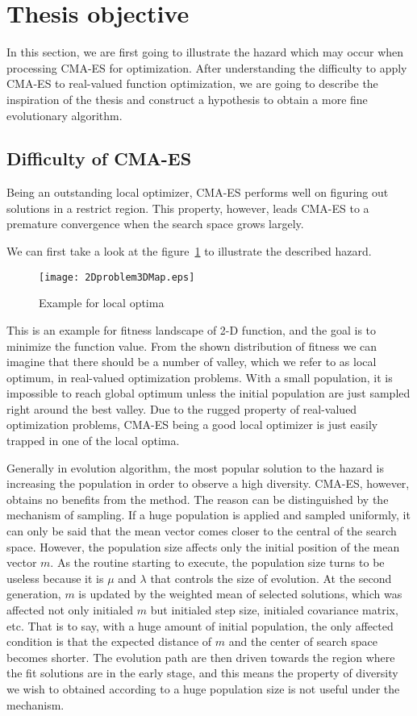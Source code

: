 \section{Thesis objective} \label{sec:motivation}

In this section, we are first going to illustrate the
hazard which may occur when processing CMA-ES for
optimization.
After understanding the difficulty to apply CMA-ES to real-valued
function optimization, we are going to describe the inspiration of the
thesis and construct a hypothesis to obtain a more fine evolutionary
algorithm.
\subsection{Difficulty of CMA-ES} Being an outstanding local optimizer,
CMA-ES performs well on figuring out solutions in a restrict region.
This property, however, leads CMA-ES to a premature convergence when the
search space grows largely. 

We can first take a look at the figure~\ref{fig:localExample} to
illustrate the described hazard.
\begin{figure}[h] \begin{center}
    \texttt{[image: 2Dproblem3DMap.eps]}
    \caption{Example for local optima}
    \label{fig:localExample} 
  \end{center} 
\end{figure}
This is an example for fitness landscape of 2-D
function, and the goal is to minimize the function
value.  From the shown distribution of fitness we can
imagine that there should be a number of valley, which
we refer to as local optimum, in real-valued
optimization problems.  With a small population, it is
impossible to reach global optimum unless the initial
population are just sampled right around the best
valley.  Due to the rugged property of real-valued
optimization problems, CMA-ES being a good local
optimizer is just easily trapped in one of the local
optima.

  Generally in evolution algorithm, the most popular
  solution to the hazard is increasing the population
  in order to observe a high diversity.  CMA-ES,
  however, obtains no benefits from the method.  The
  reason can be distinguished by the mechanism of
sampling.  If a huge population is applied and
sampled uniformly, it can only be said that the mean
vector comes closer to the central of the search
space.  However, the population size affects only
the initial position of the mean vector $m$.  As the
routine starting to execute, the population size
turns to be useless because it is $\mu$ and
$\lambda$ that controls the size of evolution.  At
the second generation, $m$ is updated by the
weighted mean of selected solutions, which was
affected not only initialed $m$ but initialed step
size, initialed covariance matrix, etc.  That is to
say, with a huge amount of initial population, the
only affected condition is that the expected
distance of $m$ and the center of search space
becomes shorter.  The evolution path are then driven
towards the region where the fit solutions are in
the early stage, and this means the property of
diversity we wish to obtained according to a huge
population size is not useful under the mechanism.

